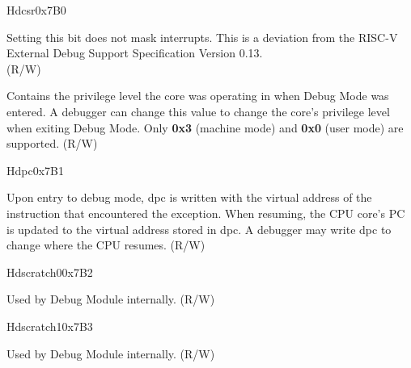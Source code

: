 \begin{register}{H}{dcsr}{0x7B0}
\begin{regdesc}
\begin{reglist}
Setting this bit does not mask interrupts. This is a deviation from the RISC-V External Debug Support Specification Version 0.13.\\
(R/W)\\
\label{fielddesc:DCSRPRV}\item [prv] Contains the privilege level the core was operating in when Debug Mode was entered. A debugger can change this value to change the core's privilege level when exiting Debug Mode. Only \textbf{0x3} (machine mode) and \textbf{0x0} (user mode) are supported. (R/W)
\end{reglist}
\end{regdesc}
\end{register}

\begin{register}{H}{dpc}{0x7B1}
\label{regdesc:DPC}
%
\regnewline%
\begin{regdesc}
\begin{reglist}
\label{fielddesc:DPC}\item [dpc] Upon entry to debug mode, dpc is written with the virtual address of the instruction that encountered the exception. When resuming, the CPU core's PC is updated to the virtual address stored in dpc. A debugger may write dpc to change where the CPU resumes. (R/W)
\end{reglist}
\end{regdesc}
\end{register}

\begin{register}{H}{dscratch0}{0x7B2}
\label{regdesc:DSCRATCH0}
%
\regnewline%
\begin{regdesc}
\begin{reglist}
\label{fielddesc:DSCRATCH0}\item [dscratch0] Used by Debug Module internally. (R/W)
\end{reglist}
\end{regdesc}
\end{register}

\begin{register}{H}{dscratch1}{0x7B3}
\label{regdesc:DSCRATCH1}
%
\regnewline%
\begin{regdesc}
\begin{reglist}
\label{fielddesc:DSCRATCH1}\item [dscratch1] Used by Debug Module internally. (R/W)
\end{reglist}
\end{regdesc}
\end{register}
